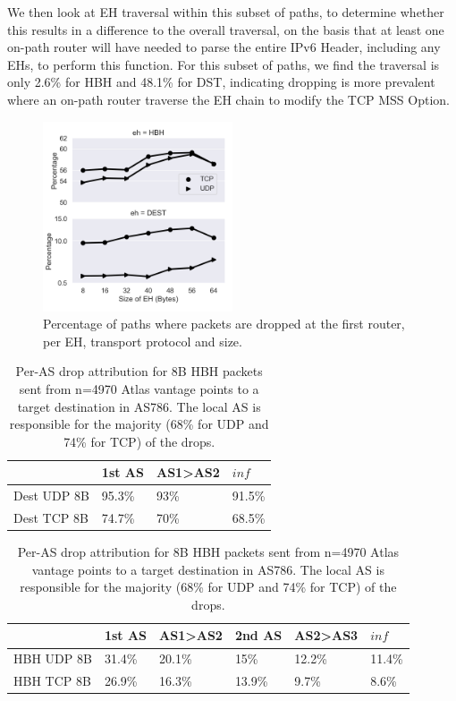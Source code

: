\documentclass[conference]{IEEEtran}
\begin{document}
We then look at EH traversal within this subset of paths, to determine whether this results in a difference to the overall traversal, on the basis that at least one on-path router will have needed to parse the entire IPv6 Header, including any EHs, to perform this function.
For this subset of paths, we find the traversal is only 2.6\% for HBH and 48.1\% for DST, indicating dropping is more prevalent where an on-path router traverse the EH chain to modify the TCP MSS Option.


\begin{figure}
\centering
  \includegraphics[width=0.5\textwidth]{empty_paths.png}
  \caption{Percentage of paths where packets are dropped at the first router, per EH, transport protocol and size.}
  \label{fig:empty_paths}
\end{figure}


\begin{table}
\centering
\caption{Per-AS drop attribution for 8B DST packets sent from n=4970 Atlas vantage points to a target destination in AS786. The local AS is responsible for the majority (5\% for UDP and 25\% for TCP) of the drops.}
 \label{tbl:uk_as1}

\begin{tabular}{l|l|l|l}
                                   & 1st AS & AS1\textgreater AS2 & $inf $     \\ \hline 

{Dest UDP 8B} & 95.3\% & 93\%                 & 91.5\% \\ \hline

{Dest TCP 8B} & 74.7\% & 70\%                 & 68.5\%
\end{tabular}
\bigskip
\caption{Per-AS drop attribution for 8B HBH packets sent from n=4970 Atlas vantage points to a target destination in AS786. The local AS is responsible for the majority (68\% for UDP and 74\% for TCP) of the drops.}
\begin{tabular}{p{}|l|l|l|l|l}

              & 1st AS & AS1\textgreater{}AS2 & 2nd AS & AS2\textgreater{}AS3 & $inf$     \\ \hline
HBH UDP 8B & 31.4\% & 20.1\%               & 15\%   & 12.2\%               & 11.4\% \\ \hline
HBH TCP 8B & 26.9\% & 16.3\%               & 13.9\% & 9.7\%                & 8.6\%  \\ 
\end{tabular}
 \label{tbl:uk_as2}
\end{table}
\end{document}
